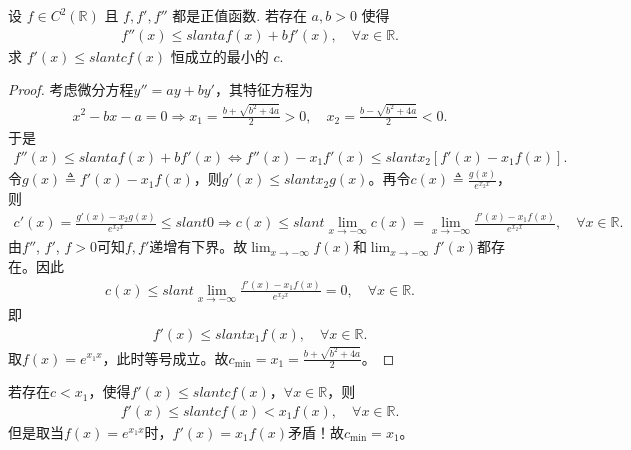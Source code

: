 \documentclass[../../main.tex]{subfiles}
\begin{document}
\begin{example}
设 $f \in C^2(\mathbb{R})$ 且 $f, f', f''$ 都是正值函数. 若存在 $a, b > 0$ 使得
\begin{align*}
f''(x) \leqslant slant a f(x) + b f'(x), \quad \forall x \in \mathbb{R}.
\end{align*}
求 $f'(x) \leqslant slant c f(x)$ 恒成立的最小的 $c$.
\end{example}
\begin{proof}
考虑微分方程$y'' = ay + by'$，其特征方程为
\begin{align*}
x^2 - bx - a = 0 \Rightarrow x_1 = \frac{b + \sqrt{b^2 + 4a}}{2} > 0, \quad x_2 = \frac{b - \sqrt{b^2 + 4a}}{2} < 0.
\end{align*}
于是
\begin{align*}
f''(x) \leqslant slant a f(x) + b f'(x) \Longleftrightarrow f''(x) - x_1 f'(x) \leqslant slant x_2 \left[ f'(x) - x_1 f(x) \right].
\end{align*}
令$g(x) \triangleq f'(x) - x_1 f(x)$，则$g'(x) \leqslant slant x_2 g(x)$。再令$c(x) \triangleq \frac{g(x)}{e^{x_2 x}}$，则
\begin{align*}
c'(x) = \frac{g'(x) - x_2 g(x)}{e^{x_2 x}} \leqslant slant 0 \Rightarrow c(x) \leqslant slant \lim_{x \rightarrow -\infty} c(x) = \lim_{x \rightarrow -\infty} \frac{f'(x) - x_1 f(x)}{e^{x_2 x}}, \quad \forall x \in \mathbb{R}.
\end{align*}
由$f''$, $f'$, $f > 0$可知$f, f'$递增有下界。故$\lim_{x \rightarrow -\infty} f(x)$和$\lim_{x \rightarrow -\infty} f'(x)$都存在。因此
\begin{align*}
c(x) \leqslant slant \lim_{x \rightarrow -\infty} \frac{f'(x) - x_1 f(x)}{e^{x_2 x}} = 0, \quad \forall x \in \mathbb{R}.
\end{align*}
即
\begin{align*}
f'(x) \leqslant slant x_1 f(x), \quad \forall x \in \mathbb{R}.
\end{align*}
取$f(x) = e^{x_1 x}$，此时等号成立。故$c_{\min} = x_1 = \frac{b + \sqrt{b^2 + 4a}}{2}$。
\end{proof}
\begin{remark}
若存在$c < x_1$，使得$f'(x) \leqslant slant c f(x)$，$\forall x \in \mathbb{R}$，则
\begin{align*}
f'(x) \leqslant slant c f(x) < x_1 f(x), \quad \forall x \in \mathbb{R}.
\end{align*}
但是取当$f(x) = e^{x_1 x}$时，$f'(x) = x_1 f(x)$矛盾！故$c_{\min} = x_1$。
\end{remark}
\end{document}
